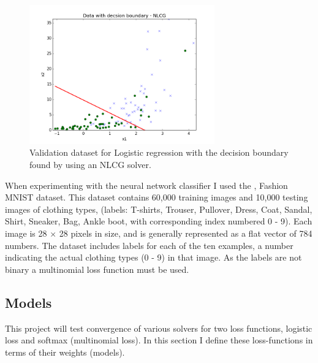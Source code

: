 \documentclass[11pt,twocolumn]{article}
\begin{document}
\begin{figure}[!ht]
\centering
\includegraphics[height=6cm, width=8cm]{../src-logistic/logReg_pred_NLCG.png}
\caption{Validation dataset for Logistic regression with the decision boundary found by using an NLCG solver.}\label{valid_dataset}
\end{figure}

When experimenting with the neural network classifier I used the \citet{FashionMNIST:data}, Fashion MNIST dataset. This dataset contains 60,000 training images and 10,000 testing images of clothing types, (labels: T-shirts, Trouser, Pullover, Dress, Coat, Sandal, Shirt, Sneaker, Bag, Ankle boot, with corresponding index numbered 0 - 9). Each image is 28 $\times$ 28 pixels in size, and is generally represented as a flat vector of 784 numbers. The dataset includes labels for each of the ten examples, a number indicating the actual clothing types (0 - 9) in that image. As the labels are not binary a multinomial loss function must be used.

\subsection{Models}   
This project will test convergence of various solvers for two loss functions, logistic loss and softmax (multinomial loss). In this section I define these loss-functions in terms of their weights (models).
\end{document}
